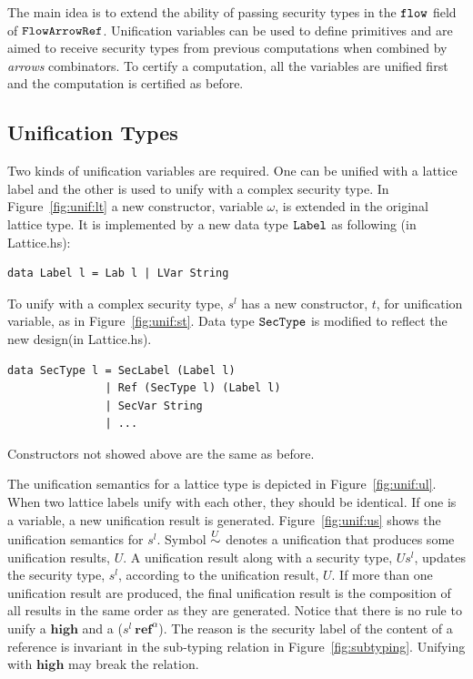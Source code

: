 \documentclass{report}
\newcommand{\co}[1]{$\cod{#1}$}
\newcommand{\st}{s^l}
\begin{document}
The main idea is to extend the ability of passing security types in the \co{flow} field 
of \co{FlowArrowRef}. Unification variables can be used to define primitives and are aimed to
receive security types from previous computations when combined by {\em arrows} combinators.
To certify a computation, all the variables are unified first and the computation is 
certified as before.

\subsection{Unification Types}
Two kinds of unification variables are required. One can be unified with a lattice label and the other
is used to  unify with a complex security type. In Figure~\ref{fig:unif:lt} a new constructor, variable $\omega$,
is extended in the original lattice type. It is implemented by a new data type \co{Label} as following
(in Lattice.hs):
\begin{Verbatim}[fontsize=\small]
data Label l = Lab l | LVar String
\end{Verbatim}
To unify with a complex security type, $\st$ has a new constructor, $t$, for unification variable, as in 
Figure~\ref{fig:unif:st}. Data type \co{SecType} is modified to reflect the new design(in Lattice.hs).
\begin{Verbatim}[fontsize=\small]
data SecType l = SecLabel (Label l) 
               | Ref (SecType l) (Label l)
               | SecVar String
               | ...
\end{Verbatim}
Constructors not showed above are the same as before.

The unification semantics for a lattice type is depicted in Figure~\ref{fig:unif:ul}. When two lattice labels
unify with each other, they should be identical. If one is a variable, a new unification
result is generated. Figure~\ref{fig:unif:us} shows the unification semantics for $\st$. 
Symbol $\stackrel{{U}}{\sim}$ denotes a unification that produces some unification results, $U$. A unification
result along with a security type, $U\st$, updates the security type, $\st$, according to the unification
result, $U$. If more than one unification result are produced, the final unification result is the 
composition of all results in the same order as they are generated. Notice that there is no rule to
unify a $\mathbf{high}$ and a ($\st~\mathbf{ref}^\alpha$). The reason is the security label of the content
of a reference is invariant in the sub-typing relation in Figure~\ref{fig:subtyping}. Unifying with
$\mathbf{high}$ may break the relation.
\end{document}
